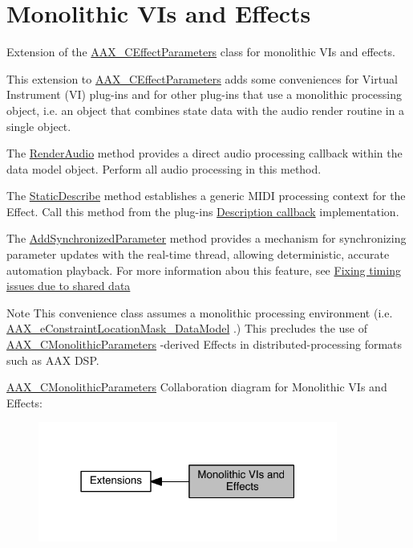\hypertarget{a00369}{}\section{Monolithic V\+Is and Effects}
\label{a00369}
Extension of the \hyperlink{a00018}{A\+A\+X\+\_\+\+C\+Effect\+Parameters} class for monolithic V\+Is and effects. 

This extension to \hyperlink{a00018}{A\+A\+X\+\_\+\+C\+Effect\+Parameters} adds some conveniences for Virtual Instrument (V\+I) plug-\/ins and for other plug-\/ins that use a monolithic processing object, i.\+e. an object that combines state data with the audio render routine in a single object.

\begin{DoxyItemize}
\item The \hyperlink{a00026_a04f2f73d70ea28c17747c68fc3a20fc8}{Render\+Audio} method provides a direct audio processing callback within the data model object. Perform all audio processing in this method. \item The \hyperlink{a00026_a69f9b80a70ecc6b7b2a7eec372d2502a}{Static\+Describe} method establishes a generic M\+I\+D\+I processing context for the Effect. Call this method from the plug-\/in\textquotesingle{}s \hyperlink{a00326}{Description callback} implementation. \item The \hyperlink{a00026_a1b23573e8aa3f8e64c61813b721559c2}{Add\+Synchronized\+Parameter} method provides a mechanism for synchronizing parameter updates with the real-\/time thread, allowing deterministic, accurate automation playback. For more information abou this feature, see \hyperlink{a00351_parameterUpdateTiming_sharedData}{Fixing timing issues due to shared data}\end{DoxyItemize}
\begin{DoxyNote}{Note}
This convenience class assumes a monolithic processing environment (i.\+e. \hyperlink{a00206_a0c5d795c1fd021c5b9b541febc34601aa027df08c137702400a92719828bea44b}{A\+A\+X\+\_\+e\+Constraint\+Location\+Mask\+\_\+\+Data\+Model} .) This precludes the use of \hyperlink{a00026}{A\+A\+X\+\_\+\+C\+Monolithic\+Parameters} -\/derived Effects in distributed-\/processing formats such as A\+A\+X D\+S\+P.
\end{DoxyNote}
\hyperlink{a00026}{A\+A\+X\+\_\+\+C\+Monolithic\+Parameters} Collaboration diagram for Monolithic V\+Is and Effects\+:
\nopagebreak
\begin{figure}[H]
\begin{center}
\leavevmode
\includegraphics[width=279pt]{a00369}
\end{center}
\end{figure}
